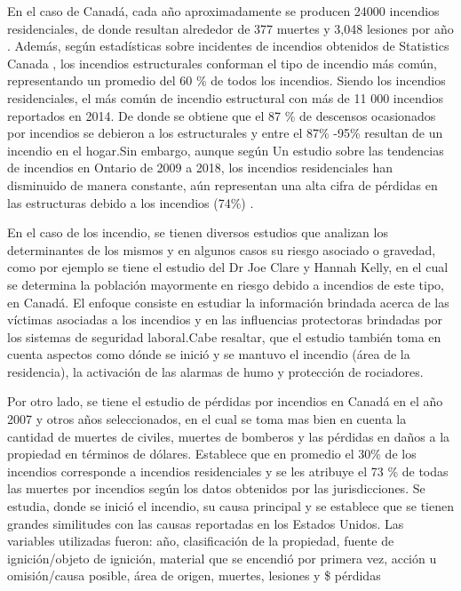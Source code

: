 \documentclass[
  oneside]{memoir}
\begin{document}
En el caso de Canadá, cada año aproximadamente se producen 24000
incendios residenciales, de donde resultan alrededor de 377 muertes y
3,048 lesiones por año \citep{SGI}. Además, según estadísticas sobre
incidentes de incendios obtenidos de Statistics Canada , los incendios
estructurales conforman el tipo de incendio más común, representando un
promedio del 60 \% de todos los incendios. Siendo los incendios
residenciales, el más común de incendio estructural con más de 11 000
incendios reportados en 2014. De donde se obtiene que el 87 \% de
descensos ocasionados por incendios se debieron a los estructurales y
entre el 87\% -95\% resultan de un incendio en el hogar.Sin embargo,
aunque según Un estudio sobre las tendencias de incendios en Ontario de
2009 a 2018, los incendios residenciales han disminuido de manera
constante, aún representan una alta cifra de pérdidas en las estructuras
debido a los incendios (74\%) \citep{ALE}.

En el caso de los incendio, se tienen diversos estudios que analizan los
determinantes de los mismos y en algunos casos su riesgo asociado o
gravedad, como por ejemplo se tiene el estudio del Dr Joe Clare y Hannah
Kelly, en el cual se determina la población mayormente en riesgo debido
a incendios de este tipo, en Canadá. El enfoque consiste en estudiar la
información brindada acerca de las víctimas asociadas a los incendios y
en las influencias protectoras brindadas por los sistemas de seguridad
laboral.Cabe resaltar, que el estudio también toma en cuenta aspectos
como dónde se inició y se mantuvo el incendio (área de la residencia),
la activación de las alarmas de humo y protección de rociadores.

Por otro lado, se tiene el estudio de pérdidas por incendios en Canadá
en el año 2007 y otros años seleccionados, en el cual se toma mas bien
en cuenta la cantidad de muertes de civiles, muertes de bomberos y las
pérdidas en daños a la propiedad en términos de dólares. Establece que
en promedio el 30\% de los incendios corresponde a incendios
residenciales y se les atribuye el 73 \% de todas las muertes por
incendios según los datos obtenidos por las jurisdicciones. Se estudia,
donde se inició el incendio, su causa principal y se establece que se
tienen grandes similitudes con las causas reportadas en los Estados
Unidos. Las variables utilizadas fueron: año, clasificación de la
propiedad, fuente de ignición/objeto de ignición, material que se
encendió por primera vez, acción u omisión/causa posible, área de
origen, muertes, lesiones y \$ pérdidas \citep{si}
\end{document}
